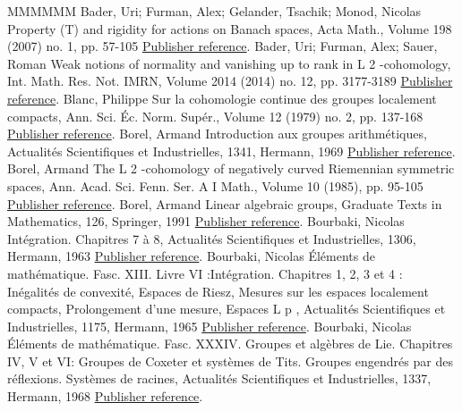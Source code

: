 \begin{thebibliography}{MMMMMM}
 Bader, Uri; Furman, Alex; Gelander, Tsachik; Monod, Nicolas Property (T) and rigidity for actions on Banach spaces, Acta Math., Volume 198 (2007) no. 1, pp. 57-105 \href{https://ahl.centre-mersenne.org/item/AHL_2020__3__1291_0/#BFGM}{Publisher reference}.
 Bader, Uri; Furman, Alex; Sauer, Roman Weak notions of normality and vanishing up to rank in L 2 -cohomology, Int. Math. Res. Not. IMRN, Volume 2014 (2014) no. 12, pp. 3177-3189 \href{https://ahl.centre-mersenne.org/item/AHL_2020__3__1291_0/#BFS}{Publisher reference}.
 Blanc, Philippe Sur la cohomologie continue des groupes localement compacts, Ann. Sci. Éc. Norm. Supér., Volume 12 (1979) no. 2, pp. 137-168 \href{https://ahl.centre-mersenne.org/item/AHL_2020__3__1291_0/#Bl}{Publisher reference}.
 Borel, Armand Introduction aux groupes arithmétiques, Actualités Scientifiques et Industrielles, 1341, Hermann, 1969 \href{https://ahl.centre-mersenne.org/item/AHL_2020__3__1291_0/#Borel-Arith}{Publisher reference}.
 Borel, Armand The L 2 -cohomology of negatively curved Riemennian symmetric spaces, Ann. Acad. Sci. Fenn. Ser. A I Math., Volume 10 (1985), pp. 95-105 \href{https://ahl.centre-mersenne.org/item/AHL_2020__3__1291_0/#Borel}{Publisher reference}.
 Borel, Armand Linear algebraic groups, Graduate Texts in Mathematics, 126, Springer, 1991 \href{https://ahl.centre-mersenne.org/item/AHL_2020__3__1291_0/#Borel-LAG}{Publisher reference}.
 Bourbaki, Nicolas Intégration. Chapitres 7 à 8, Actualités Scientifiques et Industrielles, 1306, Hermann, 1963 \href{https://ahl.centre-mersenne.org/item/AHL_2020__3__1291_0/#BBK-INT-7}{Publisher reference}.
 Bourbaki, Nicolas Éléments de mathématique. Fasc. XIII. Livre VI :Intégration. Chapitres 1, 2, 3 et 4 : Inégalités de convexité, Espaces de Riesz, Mesures sur les espaces localement compacts, Prolongement d’une mesure, Espaces L p , Actualités Scientifiques et Industrielles, 1175, Hermann, 1965 \href{https://ahl.centre-mersenne.org/item/AHL_2020__3__1291_0/#BBK-INT-1to4}{Publisher reference}.
 Bourbaki, Nicolas Éléments de mathématique. Fasc. XXXIV. Groupes et algèbres de Lie. Chapitres IV, V et VI: Groupes de Coxeter et systèmes de Tits. Groupes engendrés par des réflexions. Systèmes de racines, Actualités Scientifiques et Industrielles, 1337, Hermann, 1968 \href{https://ahl.centre-mersenne.org/item/AHL_2020__3__1291_0/#BBK-Lie-4to6}{Publisher reference}.

\end{thebibliography}
